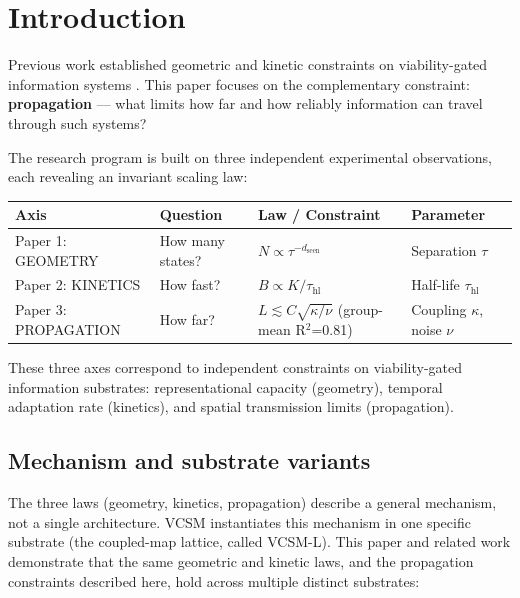 \documentclass[11pt]{article}
\begin{document}
\section{Introduction}

Previous work established geometric and kinetic constraints on viability-gated information systems \cite{aubin2026capacity, aubin2026bandwidth}. This paper focuses on the complementary constraint: \textbf{propagation} — what limits how far and how reliably information can travel through such systems?

The research program is built on three independent experimental observations, each revealing an invariant scaling law:

\begin{table}[h]
\centering
\begin{tabular}{llll}
\hline
\textbf{Axis} & \textbf{Question} & \textbf{Law / Constraint} & \textbf{Parameter} \\
\hline
Paper 1: GEOMETRY & How many states? & $N \propto \tau^{-d_{\text{seen}}}$ & Separation $\tau$ \\
Paper 2: KINETICS & How fast? & $B \propto K / \tau_{\text{hl}}$ & Half-life $\tau_{\text{hl}}$ \\
Paper 3: PROPAGATION & How far? & $L \lesssim C\sqrt{\kappa / \nu}$ (group-mean R$^2$=0.81) & Coupling $\kappa$, noise $\nu$ \\
\hline
\end{tabular}
\end{table}

\noindent These three axes correspond to independent constraints on viability-gated information substrates: representational capacity (geometry), temporal adaptation rate (kinetics), and spatial transmission limits (propagation).

\subsection{Mechanism and substrate variants}

The three laws (geometry, kinetics, propagation) describe a general mechanism, not a single architecture. VCSM instantiates this mechanism in one specific substrate (the coupled-map lattice, called VCSM-L). This paper and related work demonstrate that the same geometric and kinetic laws, and the propagation constraints described here, hold across multiple distinct substrates:
\end{document}
